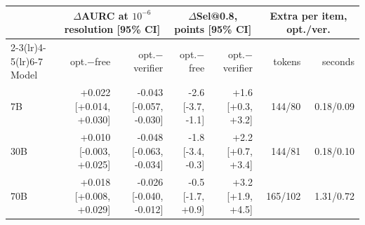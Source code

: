 \begin{tabular}{lrrrrrr}
\toprule
& \multicolumn{2}{c}{$\Delta$AURC at $10^{-6}$ resolution [95\% CI]} & \multicolumn{2}{c}{$\Delta$Sel@0.8, points [95\% CI]} & \multicolumn{2}{c}{Extra per item, opt./ver.} \\
\cmidrule(lr){2-3}\cmidrule(lr){4-5}\cmidrule(lr){6-7}
Model & opt.$-$free & opt.$-$verifier & opt.$-$free & opt.$-$verifier & tokens & seconds \\
\midrule
7B & +0.022 [+0.014, +0.030] & -0.043 [-0.057, -0.030] & -2.6 [-3.7, -1.1] & +1.6 [+0.3, +3.2] & 144/80 & 0.18/0.09 \\
30B & +0.010 [-0.003, +0.025] & -0.048 [-0.063, -0.034] & -1.8 [-3.4, -0.3] & +2.2 [+0.7, +3.4] & 144/81 & 0.18/0.10 \\
70B & +0.018 [+0.008, +0.029] & -0.026 [-0.040, -0.012] & -0.5 [-1.7, +0.9] & +3.2 [+1.9, +4.5] & 165/102 & 1.31/0.72 \\
\bottomrule
\end{tabular}
